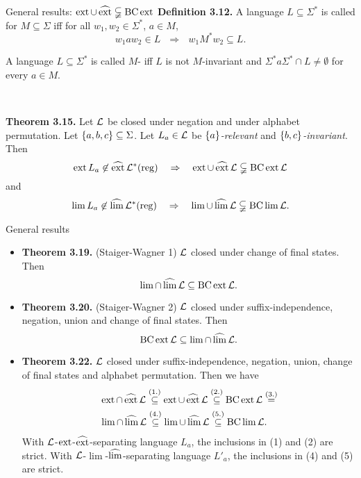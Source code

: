 \documentclass[
	handout,
	notheorems,noamsthm]{beamer}
\begin{document}
\begin{frame}[<+->]{General results: $\operatorname{ext} \cup \operatorname{\widehat{ext}} \subsetneqq \operatorname{BC} \operatorname{ext}$}
\textbf{Definition 3.12.} A language $L \subseteq \Sigma^*$ is called  for $M \subseteq\Sigma$ iff for all $w_1,w_2 \in \Sigma^*$, $a \in M$,
\[ w_1 a w_2 \in L \ \ \ \Rightarrow \ \ \  w_1 M^* w_2 \subseteq L . \]

A language $L \subseteq \Sigma^*$ is called $M$- iff $L$ is not $M$-invariant and $\Sigma^* a \Sigma^* \cap L \ne \emptyset$ for every $a \in M$.

\

\textbf{Theorem 3.15.} Let $\mathcal{L}$ be closed under negation and under alphabet permutation. Let $\Set{a,b,c} \subseteq \Sigma$. Let $L_a \in \mathcal{L}$ be \emph{$\Set{a}$-relevant} and \emph{$\Set{b,c}$-invariant}. Then
\[ \operatorname{ext} L_a \not\in \operatorname{\widehat{ext}} \mathcal{L}^*(\textup{\textrm{reg}}) \ \ \ \Rightarrow \ \ \ \operatorname{ext} \cup \operatorname{\widehat{ext}} \mathcal{L} \subsetneqq \operatorname{BC} \operatorname{ext} \mathcal{L} \]
and
\[ \lim L_a \not\in \dlim \Langreg \ \ \ \Rightarrow \ \ \ \lim \cup \dlim \Lang \subsetneqq \BC \lim \Lang . \]
\end{frame}

\begin{frame}[<+->]{General results}
\begin{itemize}
\item \textbf{Theorem 3.19.} (Staiger-Wagner 1) $\mathcal{L}$ closed under change of final states. Then
\[ \lim \cap \operatorname{\widehat{lim}} \mathcal{L} \subseteq \operatorname{BC} \operatorname{ext} \mathcal{L} . \]
\item \textbf{Theorem 3.20.} (Staiger-Wagner 2) $\mathcal{L}$ closed under suffix-independence, negation, union and change of final states. Then
\[ \operatorname{BC} \operatorname{ext} \mathcal{L} \subseteq \lim \cap \operatorname{\widehat{lim}} \mathcal{L} . \]
\item \textbf{Theorem 3.22.} $\mathcal{L}$ closed under suffix-independence, negation, union, change of final states and alphabet permutation.
Then we have
\begin{align*}
& \operatorname{ext} \cap \operatorname{\widehat{ext}} \mathcal{L} \stackrel{(1.)}\subseteq
\operatorname{ext} \cup \operatorname{\widehat{ext}} \mathcal{L} \stackrel{(2.)}\subseteq
\operatorname{BC} \operatorname{ext} \mathcal{L} \stackrel{(3.)}= \\
& \lim \cap \operatorname{\widehat{lim}} \mathcal{L} \stackrel{(4.)}\subseteq
\lim \cup \operatorname{\widehat{lim}} \mathcal{L} \stackrel{(5.)}\subseteq
\operatorname{BC} \lim \mathcal{L} .
\end{align*}
With $\mathcal{L}$-$\operatorname{ext}$-$\operatorname{\widehat{ext}}$-separating language $L_a$, the inclusions in (1) and (2) are strict.
With $\mathcal{L}$-$\lim$-$\operatorname{\widehat{lim}}$-separating language $L'_a$, the inclusions in (4) and (5) are strict.\end{itemize}
\end{frame}
\end{document}
